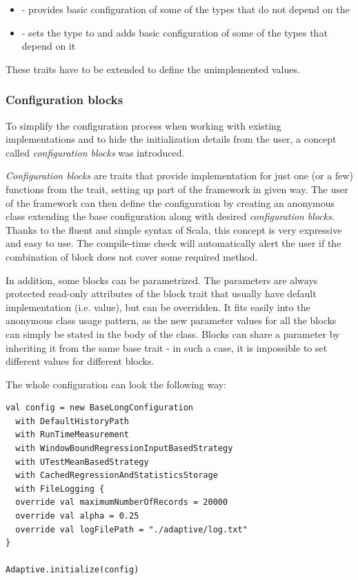 \begin{itemize}
	\item {} - provides basic configuration of some of the types that do not depend on the 
	\item {} - sets the  type to  and adds basic configuration of some of the types that depend on it
\end{itemize}

These traits have to be extended to define the unimplemented values.

\subsubsection{Configuration blocks}
 To simplify the configuration process when working with existing implementations and to hide the initialization details from the user, a concept called \textit{configuration blocks} was introduced. 
 
 \textit{Configuration blocks} are traits that provide implementation for just one (or a few) functions from the  trait, setting up part of the framework in given way. The user of the framework can then define the configuration by creating an anonymous class extending the base configuration along with desired \textit{configuration blocks}. Thanks to the fluent and simple syntax of Scala, this concept is very expressive and easy to use. The compile-time check will automatically alert the user if the combination of block does not cover some required method.
 
 In addition, some blocks can be parametrized. The parameters are always protected read-only attributes of the block trait that usually have default implementation (i.e. value), but can be overridden. It fits easily into the anonymous class usage pattern, as the new parameter values for all the blocks can simply be stated in the body of the class. Blocks can share a parameter by inheriting it from the same base trait - in such a case, it is impossible to set different values for different blocks.
 
 The whole configuration can look the following way:

\lstset{style=Scala}
\begin{lstlisting}
val config = new BaseLongConfiguration
  with DefaultHistoryPath
  with RunTimeMeasurement
  with WindowBoundRegressionInputBasedStrategy
  with UTestMeanBasedStrategy
  with CachedRegressionAndStatisticsStorage
  with FileLogging {
  override val maximumNumberOfRecords = 20000
  override val alpha = 0.25
  override val logFilePath = "./adaptive/log.txt"
}

Adaptive.initialize(config)
\end{lstlisting}

